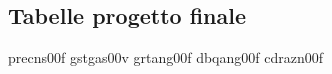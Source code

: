 \documentclass[target=bach,aauheader=,style=]{thud}
\begin{document}
\subsection{Tabelle progetto finale}
precns00f %
gstgas00v
grtang00f
dbqang00f 
cdrazn00f %

\backmatter




\end{document}
